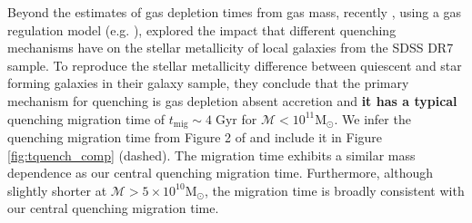 \documentclass[iop,apj,tighten,twocolappendix,numberedappendix]{emulateapj}
\newcommand{\edited}[1]{\textcolor{red}{ #1}}
\begin{document}
Beyond the estimates of gas depletion times from gas mass, 
recently \cite{Peng:2015aa}, using a gas regulation model 
(e.g. \citealt{Lilly:2013aa, Peng:2014aa}), explored the impact that 
different quenching mechanisms have on the stellar metallicity 
of local galaxies from the SDSS DR7 sample. To reproduce the stellar
metallicity difference between quiescent and star forming galaxies 
in their galaxy sample, they conclude that the primary mechanism for 
quenching is gas depletion absent accretion and {\color{red} \bf it has a typical} quenching 
migration time of $t_\mathrm{mig} \sim 4\;\mathrm{Gyr}$ for 
$\mathcal{M} < 10^{11}\mathrm{M}_\odot$. 
We infer the quenching migration time from Figure 2 of \cite{Peng:2015aa}
and include it in Figure \ref{fig:tquench_comp} (dashed). 
The \cite{Peng:2015aa} migration time exhibits a similar mass 
dependence as our central quenching migration time. Furthermore, 
although slightly shorter at $\mathcal{M} > 5 \times 10^{10} \mathrm{M}_\odot$, 
the migration time is broadly consistent with our central 
quenching migration time.

\end{document}
